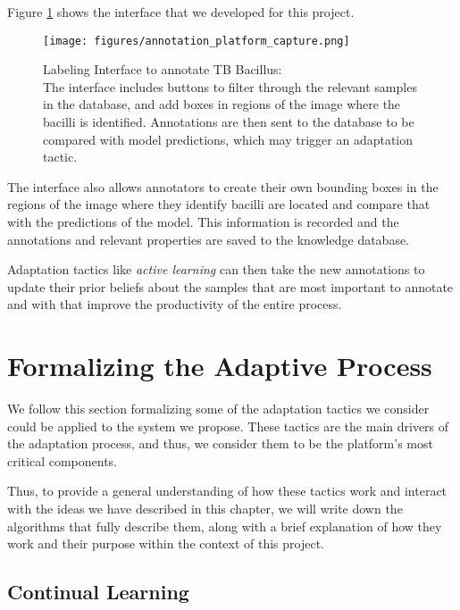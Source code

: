 \documentclass[../main.tex]{subfiles}
\begin{document}
   Figure \ref{fig:labeling_interface} shows the interface that we developed for this project.

   \begin{figure}
       \centering
       \texttt{[image: figures/annotation\_platform\_capture.png]}
       \caption{Labeling Interface to annotate TB Bacillus:\\\footnotesize The interface includes buttons to filter through the relevant samples in the database, and add boxes in regions of the image where the bacilli is identified. Annotations are then sent to the database to be compared with model predictions, which may trigger an adaptation tactic.}
       \label{fig:labeling_interface}
   \end{figure}

   The interface also allows annotators to create their own bounding boxes in the regions of the image where they identify bacilli are located and compare that with the predictions of the model. This information is recorded and the annotations and relevant properties are saved to the knowledge database.

   Adaptation tactics like \textit{active learning} can then take the new annotations to update their prior beliefs about the samples that are most important to annotate and with that improve the productivity of the entire process.


    \section{Formalizing the Adaptive Process}


    We follow this section formalizing some of the adaptation tactics we consider could be applied to the system we propose. These tactics are the main drivers of the adaptation process, and thus, we consider them to be the platform's most critical components.

    Thus, to provide a general understanding of how these tactics work and interact with the ideas we have described in this chapter, we will write down the algorithms that fully describe them, along with a brief explanation of how they work and their purpose within the context of this project.

    
    
    \subsection{Continual Learning}
    \vspace{-0.45cm}
    
\end{document}
